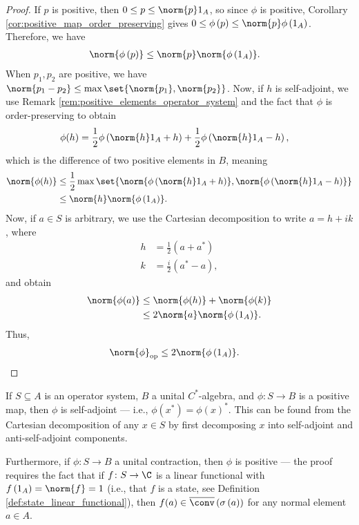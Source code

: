 \begin{proof}
  If $p$ is positive, then $0\leq p \leq \norm{p}1_A$, so since $\phi$ is positive, Corollary \ref{cor:positive_map_order_preserving} gives $0\leq \phi\left( p \right)\leq \norm{p}\phi\left( 1_A \right)$. Therefore, we have
  \begin{align*}
    \norm{\phi\left( p \right)} &\leq \norm{p}\norm{\phi\left( 1_A \right)}.
  \end{align*}
  When $p_1,p_2$ are positive, we have $\norm{p_1 - p_2}\leq \max\set{\norm{p_1},\norm{p_2}}$. Now, if $h$ is self-adjoint, we use Remark \ref{rem:positive_elements_operator_system} and the fact that $\phi$ is order-preserving to obtain
  \begin{align*}
    \phi(h) &= \frac{1}{2}\phi\left( \norm{h}1_A + h \right) + \frac{1}{2}\phi\left( \norm{h}1_A - h \right),
  \end{align*}
  which is the difference of two positive elements in $B$, meaning
  \begin{align*}
    \norm{\phi(h)} &\leq \frac{1}{2}\max\set{\norm{\phi\left( \norm{h}1_A + h \right)},\norm{\phi\left( \norm{h}1_A - h \right)}}\\
                   &\leq \norm{h}\norm{\phi\left( 1_A \right)}.
  \end{align*}
  Now, if $a\in S$ is arbitrary, we use the Cartesian decomposition to write $a = h + ik$, where
  \begin{align*}
    h &= \frac{1}{2}\left( a + a^{\ast} \right)\\
    k &= \frac{i}{2}\left( a^{\ast}-a \right),
  \end{align*}
  and obtain
  \begin{align*}
    \norm{\phi(a)} &\leq \norm{\phi(h)} + \norm{\phi(k)}\\
                   &\leq 2\norm{a}\norm{\phi\left( 1_A \right)}.
  \end{align*}
  Thus,
  \begin{align*}
    \norm{\phi}_{\op} &\leq 2\norm{\phi\left( 1_A \right)}.
  \end{align*}
\end{proof}
\begin{remark}
  If $S\subseteq A$ is an operator system, $B$ a unital $C^{\ast}$-algebra, and $\phi\colon S\rightarrow B$ is a positive map, then $\phi$ is self-adjoint --- i.e., $\phi\left( x^{\ast} \right) = \phi\left( x \right)^{\ast}$. This can be found from the Cartesian decomposition of any $x\in S$ by first decomposing $x$ into self-adjoint and anti-self-adjoint components.\newline

  Furthermore, if $\phi\colon S\rightarrow B$ a unital contraction, then $\phi$ is positive --- the proof requires the fact that if $f\colon S\rightarrow \C$ is a linear functional with $f\left(1_A\right) = \norm{f} = 1$ (i.e., that $f$ is a state, see Definition \ref{def:state_linear_functional}), then $f(a)\in \overline{\conv}\left( \sigma\left( a \right) \right)$ for any normal element $a\in A$.
\end{remark}
